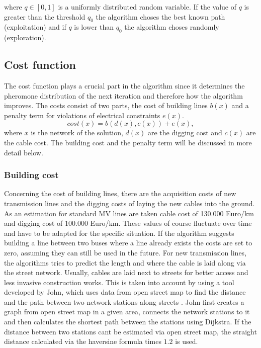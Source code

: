 where $q \in [0,1]$ is a uniformly distributed random variable. If the value of $q$ is greater than the threshold $q_0$ the algorithm choses the best known path (exploitation) and if $q$ is lower than $q_0$ the algorithm choses randomly (exploration). 

\subsection{Cost function}
The cost function plays a crucial part in the algorithm since it determines the pheromone distribution of the next iteration and therefore how the algorithm improves. The costs consist of two parts, the cost of building lines $b(x)$ and a penalty term for violations of electrical constraints $e(x)$.
$$cost(x) = b(d(x), c(x)) + e(x),$$
where $x$ is the network of the solution, $d(x)$ are the digging cost and $c(x)$ are the cable cost. The building cost and the penalty term will be discussed in more detail below.

\subsubsection{Building cost}
Concerning the cost of building lines, there are the acquisition costs of new transmission lines and the digging costs of laying the new cables into the ground. As an estimation for standard MV lines are taken cable cost of 130.000 Euro/km and digging cost of 100.000 Euro/km. These values of course fluctuate over time and have to be adapted for the specific situation. If the algorithm suggests building a line between two buses where a line already exists the costs are set to zero, assuming they can still be used in the future. For new transmission lines, the algorithms tries to predict the length and where the cable is laid along via the street network. Usually, cables are laid next to streets for better access and less invasive construction works. This is taken into account by using a tool developed by John, which uses data from open street map to find the distance and the path between two network stations along streets \cite{robert_john}. John first creates a graph from open street map in a given area, connects the network stations to it and then calculates the shortest path between the stations using Dijkstra. If the distance between two stations cant be estimated via open street map, the straight distance calculated via the haversine formula times $1.2$ is used.


